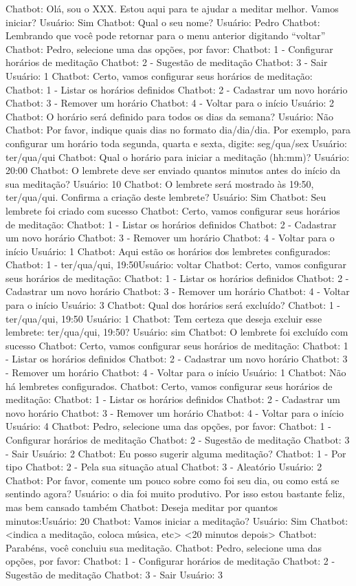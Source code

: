 Chatbot: Olá, sou o XXX. Estou aqui para te ajudar a meditar melhor. Vamos iniciar?
Usuário: Sim
Chatbot: Qual o seu nome?
Usuário: Pedro
Chatbot: Lembrando que você pode retornar para o menu anterior digitando “voltar”
Chatbot: Pedro, selecione uma das opções, por favor:
Chatbot: 1 - Configurar horários de meditação
Chatbot: 2 - Sugestão de meditação
Chatbot: 3 - Sair
Usuário: 1
Chatbot: Certo, vamos configurar seus horários de meditação:
Chatbot: 1 - Listar os horários definidos
Chatbot: 2 - Cadastrar um novo horário
Chatbot: 3 - Remover um horário
Chatbot: 4 - Voltar para o início
Usuário: 2
Chatbot: O horário será definido para todos os dias da semana?
Usuário: Não
Chatbot: Por favor, indique quais dias no formato dia/dia/dia. Por exemplo, para configurar
um horário toda segunda, quarta e sexta, digite: seg/qua/sex
Usuário: ter/qua/qui
Chatbot: Qual o horário para iniciar a meditação (hh:mm)?
Usuário: 20:00
Chatbot: O lembrete deve ser enviado quantos minutos antes do início da sua meditação?
Usuário: 10
Chatbot: O lembrete será mostrado às 19:50, ter/qua/qui. Confirma a criação deste
lembrete?
Usuário: Sim
Chatbot: Seu lembrete foi criado com sucesso
Chatbot: Certo, vamos configurar seus horários de meditação:
Chatbot: 1 - Listar os horários definidos
Chatbot: 2 - Cadastrar um novo horário
Chatbot: 3 - Remover um horário
Chatbot: 4 - Voltar para o início
Usuário: 1
Chatbot: Aqui estão os horários dos lembretes configurados:
Chatbot: 1 - ter/qua/qui, 19:50Usuário: voltar
Chatbot: Certo, vamos configurar seus horários de meditação:
Chatbot: 1 - Listar os horários definidos
Chatbot: 2 - Cadastrar um novo horário
Chatbot: 3 - Remover um horário
Chatbot: 4 - Voltar para o início
Usuário: 3
Chatbot: Qual dos horários será excluído?
Chatbot: 1 - ter/qua/qui, 19:50
Usuário: 1
Chatbot: Tem certeza que deseja excluir esse lembrete: ter/qua/qui, 19:50?
Usuário: sim
Chatbot: O lembrete foi excluído com sucesso
Chatbot: Certo, vamos configurar seus horários de meditação:
Chatbot: 1 - Listar os horários definidos
Chatbot: 2 - Cadastrar um novo horário
Chatbot: 3 - Remover um horário
Chatbot: 4 - Voltar para o início
Usuário: 1
Chatbot: Não há lembretes configurados.
Chatbot: Certo, vamos configurar seus horários de meditação:
Chatbot: 1 - Listar os horários definidos
Chatbot: 2 - Cadastrar um novo horário
Chatbot: 3 - Remover um horário
Chatbot: 4 - Voltar para o início
Usuário: 4
Chatbot: Pedro, selecione uma das opções, por favor:
Chatbot: 1 - Configurar horários de meditação
Chatbot: 2 - Sugestão de meditação
Chatbot: 3 - Sair
Usuário: 2
Chatbot: Eu posso sugerir alguma meditação?
Chatbot: 1 - Por tipo
Chatbot: 2 - Pela sua situação atual
Chatbot: 3 - Aleatório
Usuário: 2
Chatbot: Por favor, comente um pouco sobre como foi seu dia, ou como está se sentindo
agora?
Usuário: o dia foi muito produtivo. Por isso estou bastante feliz, mas bem cansado também
Chatbot: Deseja meditar por quantos minutos:Usuário: 20
Chatbot: Vamos iniciar a meditação?
Usuário: Sim
Chatbot: <indica a meditação, coloca música, etc>
<20 minutos depois>
Chatbot: Parabéns, você concluiu sua meditação.
Chatbot: Pedro, selecione uma das opções, por favor:
Chatbot: 1 - Configurar horários de meditação
Chatbot: 2 - Sugestão de meditação
Chatbot: 3 - Sair
Usuário: 3